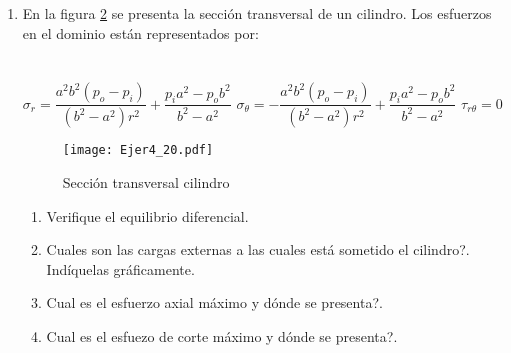 \documentclass[../notas medios.tex]{subfiles}
\begin{document}
\begin{enumerate}
	\hspace*{10mm} $ \tau_{xy} (t) = 0$; \hspace*{5mm} $\tau_{xz} (t) = 0$; \hspace*{5mm} $\tau_{yz} (t) = 0$ \\
\\	
Donde, $K(t)$ es un par\'ametro que var\'ia en funci\'on del tiempo $t$, tal como se muestra en la gr\'afica y tabla presentadas en la \cref{carga}.
%
\begin{figure}[H]
	\centering
	\texttt{[image: Ejer4\_19.pdf]} 	
	\caption{Variaci\'on del par\'ametro $K$}
	\label{carga}
\end{figure}

\begin{enumerate}
	\item Si el material es infinitamente resistente ante esfuerzos normales (axiales), pero no soporta esfuerzos cortantes mayores o iguales a $13\dfrac{kgf}{cm^2}$ determine el instante en que se presenta la falla en caso de que se presente. Si no hay falla ind\'iquelo claramente.\\
\end{enumerate}
\item \label{punto20} En la figura \ref{dona} se presenta la secci\'on
transversal de un cilindro. Los esfuerzos en el dominio est\'an representados por:\\\\
	\\
	$\sigma_{r} = \dfrac{a^2 b^2 (p_o-p_i)}{(b^2-a^2)r^2} + \dfrac{p_i a^2 - p_o b^2}{b^2-a^2}$ \hspace{10mm}
	$\sigma_{\theta} = -\dfrac{a^2 b^2 (p_o-p_i)}{(b^2-a^2)r^2} + \dfrac{p_i a^2 - p_o b^2}{b^2-a^2}$\hspace{10mm}
	$\tau_{r \theta} = 0$ 
	\begin{figure}[H]
		\centering
		\texttt{[image: Ejer4\_20.pdf]} 
		\caption{Secci\'on transversal cilindro}
		\label{dona}
	\end{figure}
	\begin{enumerate}
		\item Verifique el equilibrio diferencial.
		\item \textquestiondown Cuales son las cargas externas a las cuales est\'a sometido el cilindro?. Indíquelas gr\'aficamente.
		\item \textquestiondown Cual es el esfuerzo axial m\'aximo y d\'onde se presenta?.
		\item \textquestiondown Cual es el esfuezo de corte m\'aximo y d\'onde se presenta?.

\end{enumerate}
\end{enumerate}
\end{document}
